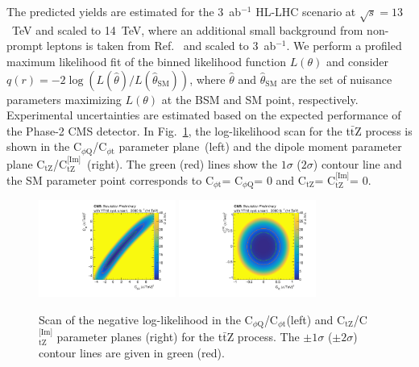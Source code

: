 \documentclass[letterpaper,11pt]{article}
\def\ttZ{t$\bar{\text{t}}$Z\xspace}
\def\ctZ{C$_\text{tZ}$\xspace}
\def\ctZI{C$_\text{tZ}^\text{[Im]}$\xspace}
\def\cpt{C$_{\phi \text{t}}$\xspace}
\def\cpQM{C$_{\phi \text{Q}}$\xspace}
\def\TeV{TeV\xspace}
\begin{document}
The predicted yields are estimated for the 3~ab${}^{-1}$ HL-LHC scenario at $\sqrt{s}=13$~\TeV and scaled to 14~\TeV, where an additional small background from non-prompt leptons is taken from Ref.~\cite{Sirunyan:2017uzs} and scaled to 3~ab${}^{-1}$.
We perform a profiled maximum likelihood fit of the binned likelihood function $L(\theta)$ and consider $q(r)=-2\log(L(\hat{\theta})/L(\hat{\theta}_{\textrm{SM}}))$, where $\hat{\theta}$ and
$\hat{\theta}_\textrm{SM}$ are the set of nuisance parameters maximizing $L(\theta)$ at the BSM and SM point, respectively.
Experimental uncertainties are estimated based on the expected performance of the Phase-2 CMS detector.
In Fig.~\ref{fig:ttZ_nll}, the log-likelihood scan for the \ttZ process is shown in the \cpQM/\cpt parameter plane~(left) and the dipole moment parameter plane \ctZ/\ctZI~(right).
The green (red) lines show the $1\sigma$ ($2\sigma$) contour line and the SM parameter point corresponds to \cpt = \cpQM = 0 and \ctZ = \ctZI = 0.

\begin{figure}[tbp]
  \centering
    \includegraphics[trim={0.4cm 0.3cm 0.8cm 0.cm},clip,width=0.4\textwidth]{Figures/cpQM_cpt_lumi3000_14TeV_CMScombine_r1_fullUnc.pdf}
    \hspace{1cm}
    \includegraphics[trim={0.4cm 0.3cm 0.8cm 0.cm},clip,width=0.4\textwidth]{Figures/ctZ_ctZI_lumi3000_14TeV_CMScombine_r1_fullUnc.pdf}
  \caption{Scan of the negative log-likelihood in the \cpQM/\cpt (left) and \ctZ/\ctZI parameter planes (right) for the \ttZ process. 
           The $\pm 1\sigma$ ($\pm 2\sigma$) contour lines are given in green (red).
           }
  \label{fig:ttZ_nll}
\end{figure}

\clearpage


\end{document}
